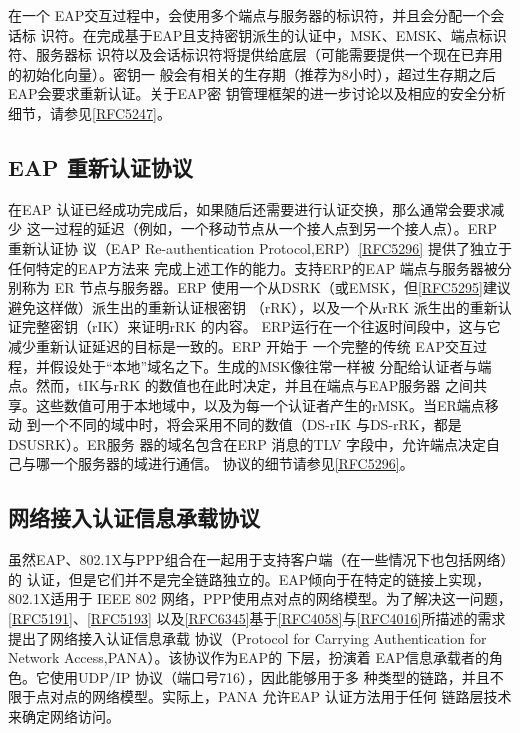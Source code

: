 在一个 EAP交互过程中，会使用多个端点与服务器的标识符，并且会分配一个会话标
识符。在完成基于EAP且支持密钥派生的认证中，MSK、EMSK、端点标识符、服务器标
识符以及会话标识符将提供给底层（可能需要提供一个现在已弃用的初始化向量）。密钥一
般会有相关的生存期（推荐为8小时），超过生存期之后EAP会要求重新认证。关于EAP密
钥管理框架的进一步讨论以及相应的安全分析细节，请参见\href{https://www.rfc-editor.org/rfc/rfc5247}{[RFC5247]}。

\subsection{EAP 重新认证协议}
在EAP 认证已经成功完成后，如果随后还需要进行认证交换，那么通常会要求减少
这一过程的延迟（例如，一个移动节点从一个接人点到另一个接人点）。ERP 重新认证协
议（EAP Re-authentication Protocol,ERP）\href{https://www.rfc-editor.org/rfc/rfc5296}{[RFC5296]} 提供了独立于任何特定的EAP方法来
完成上述工作的能力。支持ERP的EAP 端点与服务器被分别称为 ER 节点与服务器。ERP
使用一个从DSRK（或EMSK，但\href{https://www.rfc-editor.org/rfc/rfc5295}{[RFC5295]}建议避免这样做）派生出的重新认证根密钥
（rRK），以及一个从rRK 派生出的重新认证完整密钥（rIK）来证明rRK 的内容。
ERP运行在一个往返时间段中，这与它减少重新认证延迟的目标是一致的。ERP 开始于
一个完整的传统 EAP交互过程，并假设处于“本地”域名之下。生成的MSK像往常一样被
分配给认证者与端点。然而，tIK与rRK 的数值也在此时决定，并且在端点与EAP服务器
之间共享。这些数值可用于本地域中，以及为每一个认证者产生的rMSK。当ER端点移动
到一个不同的域中时，将会采用不同的数值（DS-rIK 与DS-rRK，都是DSUSRK）。ER服务
器的域名包含在ERP 消息的TLV 字段中，允许端点决定自己与哪一个服务器的域进行通信。
协议的细节请参见\href{https://www.rfc-editor.org/rfc/rfc5296}{[RFC5296]}。

\subsection{网络接入认证信息承载协议}

虽然EAP、802.1X与PPP组合在一起用于支持客户端（在一些情况下也包括网络）的
认证，但是它们并不是完全链路独立的。EAP倾向于在特定的链接上实现，802.1X适用于
IEEE 802 网络，PPP使用点对点的网络模型。为了解决这一问题，\href{https://www.rfc-editor.org/rfc/rfc5191}{[RFC5191]}、\href{https://www.rfc-editor.org/rfc/rfc5193}{[RFC5193]}
以及\href{https://www.rfc-editor.org/rfc/rfc6345}{[RFC6345]}基于\href{https://www.rfc-editor.org/rfc/rfc4058}{[RFC4058]}与\href{https://www.rfc-editor.org/rfc/rfc4016}{[RFC4016]}所描述的需求提出了网络接入认证信息承载
协议（Protocol for Carrying Authentication for Network Access,PANA）。该协议作为EAP的
下层，扮演着 EAP信息承载者的角色。它使用UDP/IP 协议（端口号716），因此能够用于多
种类型的链路，并且不限于点对点的网络模型。实际上，PANA 允许EAP 认证方法用于任何
链路层技术来确定网络访问。

